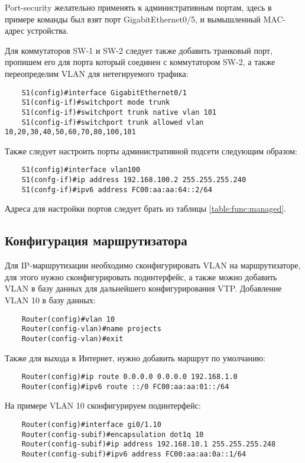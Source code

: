 Port-security желательно применять к административным портам, здесь в примере команды был взят порт GigabitEthernet0/5,
и вымышленный MAC-адрес устройства. 

Для коммутаторов SW-1 и SW-2 следует также добавить транковый порт, пропишем его для порта который соединен с коммутатором SW-2,
а также переопределим VLAN для нетегируемого трафика:

\begin{lstlisting}
    S1(config)#interface GigabitEthernet0/1
    S1(config-if)#switchport mode trunk
    S1(config-if)#switchport trunk native vlan 101
    S1(config-if)#switchport trunk allowed vlan 10,20,30,40,50,60,70,80,100,101
\end{lstlisting}

Также следует настроить порты административной подсети следующим образом:

\begin{lstlisting}
    S1(config)#interface vlan100
    S1(confg-if)#ip address 192.168.100.2 255.255.255.240
    S1(confg-if)#ipv6 address FC00:aa:aa:64::2/64
\end{lstlisting}

Адреса для настройки портов следует брать из таблицы \ref{table:func:managed}.

\subsection{Конфигурация маршрутизатора}

Для IP-маршрутизации необходимо сконфигурировать VLAN на маршрутизаторе, для этого нужно сконфигурировать
подинтерфейс, а также можно добавить VLAN в базу данных для дальнейшего конфигурирования VTP.
Добавление VLAN 10 в базу данных:
\begin{lstlisting}
    Router(config)#vlan 10
    Router(config-vlan)#name projects
    Router(config-vlan)#exit
\end{lstlisting}

Также для выхода в Интернет, нужно добавить маршрут по умолчанию:

\begin{lstlisting}
    Router(config)#ip route 0.0.0.0 0.0.0.0 192.168.1.0
    Router(config)#ipv6 route ::/0 FC00:aa:aa:01::/64
\end{lstlisting}

На примере VLAN 10 сконфигурируем подинтерфейс:

\begin{lstlisting}
    Router(config)#interface gi0/1.10
    Router(config-subif)#encapsulation dot1q 10
    Router(config-subif)#ip address 192.168.10.1 255.255.255.248
    Router(config-subif)#ipv6 address FC00:aa:aa:0a::1/64
\end{lstlisting}

